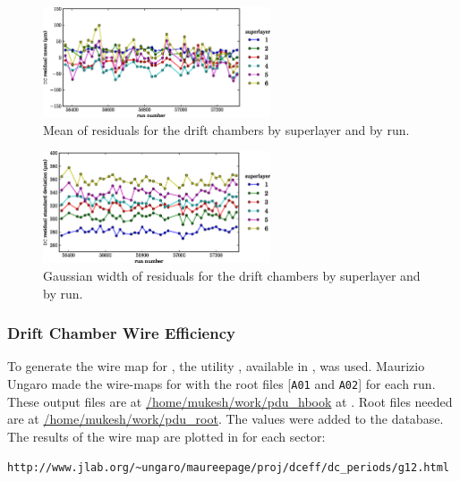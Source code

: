 \begin{figure}\begin{center}
\includegraphics[width=0.6\textwidth]{figures/calib/dc/dc_resid_mean.eps}
\caption[DC Residuals (Mean)]{\label{fig:calib.dc.residuals.mean}Mean of residuals for the drift chambers by superlayer and by run.}
\end{center}\end{figure}

\begin{figure}\begin{center}
\includegraphics[width=0.6\textwidth]{figures/calib/dc/dc_resid_sigma.eps}
\caption[DC Residuals (Width)]{\label{fig:calib.dc.residuals.wid}Gaussian width of residuals for the drift chambers by superlayer and by run.}
\end{center}\end{figure}

\subsubsection{\label{sec:calib.dc.eff}Drift Chamber Wire Efficiency}

To generate the wire map for , the utility , available in , was used. Maurizio Ungaro made the wire-maps for  with the root files [\verb+A01+ and \verb+A02+] for each run. These output files are at \url{/home/mukesh/work/pdu_hbook} at . Root files needed are at \url{/home/mukesh/work/pdu_root}. The values were added to the  database. The results of the wire map are plotted in for each sector:

\begin{verbatim}
http://www.jlab.org/~ungaro/maureepage/proj/dceff/dc_periods/g12.html
\end{verbatim}

\FloatBarrier

